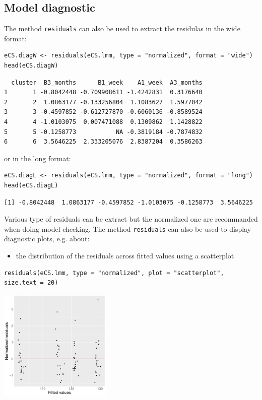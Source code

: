 \documentclass[12pt]{article}
\begin{document}
\clearpage

\subsection{Model diagnostic}
\label{sec:org2c368cb}

The method \texttt{residuals} can also be used to extract the residulas in
the wide format:
\lstset{language=r,label= ,caption= ,captionpos=b,numbers=none}
\begin{lstlisting}
eCS.diagW <- residuals(eCS.lmm, type = "normalized", format = "wide")
head(eCS.diagW)
\end{lstlisting}

\begin{verbatim}
  cluster  B3_months      B1_week    A1_week  A3_months
1       1 -0.8042448 -0.709908611 -1.4242831  0.3176640
2       2  1.0863177 -0.133256804  1.1083627  1.5977042
3       3 -0.4597852 -0.612727870 -0.6060136 -0.8589524
4       4 -1.0103075  0.007471088  0.1309862  1.1428822
5       5 -0.1258773           NA -0.3819184 -0.7874832
6       6  3.5646225  2.333205076  2.8387204  0.3586263
\end{verbatim}


or in the long format:
\lstset{language=r,label= ,caption= ,captionpos=b,numbers=none}
\begin{lstlisting}
eCS.diagL <- residuals(eCS.lmm, type = "normalized", format = "long")
head(eCS.diagL)
\end{lstlisting}

\begin{verbatim}
[1] -0.8042448  1.0863177 -0.4597852 -1.0103075 -0.1258773  3.5646225
\end{verbatim}


Various type of residuals can be extract but the normalized one are
recommanded when doing model checking. The method \texttt{residuals} can also
be used to display diagnostic plots, e.g. about:
\begin{itemize}
\item the distribution of the residuals across fitted values using a
scatterplot
\end{itemize}
\lstset{language=r,label= ,caption= ,captionpos=b,numbers=none}
\begin{lstlisting}
residuals(eCS.lmm, type = "normalized", plot = "scatterplot", size.text = 20)
\end{lstlisting}

\begin{center}
\includegraphics[width=0.4\textwidth]{./figures/diag-scatterplot.pdf}
\end{center}
\end{document}
